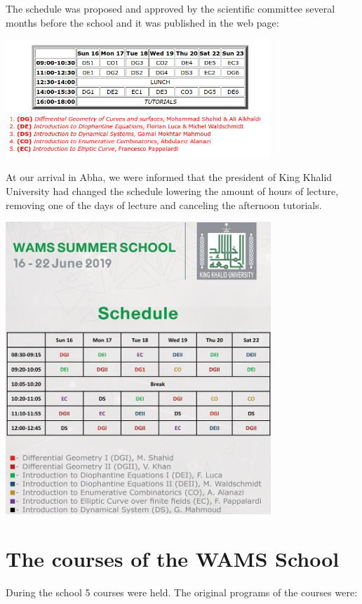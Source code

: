 \documentclass[12pt,a4paper]{scrartcl}
\begin{document}
The schedule was proposed and approved by the scientific committee several months before the school and it was published in the web page:

\centerline{\includegraphics[width=10cm]{schedule_old.png}}

At our arrival in Abha, we were informed that the president of King Khalid University had changed the schedule lowering the amount of hours of lecture, removing one of the days of lecture and canceling the afternoon tutorials. 

\centerline{\includegraphics[width=10cm]{schedule_n.jpeg}}

\section{The courses of the WAMS School}

During the school 5 courses were held. The original programs of the courses were:
\end{document}
